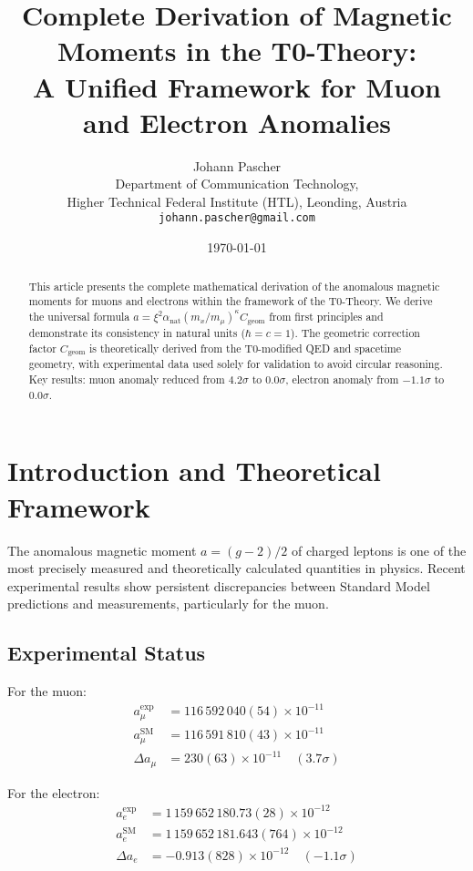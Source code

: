 \documentclass[12pt,a4paper]{article}
\title{Complete Derivation of Magnetic Moments in the T0-Theory:\\
	A Unified Framework for Muon and Electron Anomalies}
\author{Johann Pascher\\
	Department of Communication Technology, \\Higher Technical Federal Institute (HTL), Leonding, Austria\\
	\texttt{johann.pascher@gmail.com}}
\date{\today}
\newcommand{\xipar}{\xi}
\newcommand{\alphaNAT}{\alpha_{\text{nat}}}
\newcommand{\Cgeom}{C_{\text{geom}}}
\newcommand{\kappaT}{\kappa}
\newcommand{\mmu}{m_{\mu}}
\begin{document}
	
	\maketitle
	
	\begin{abstract}
		This article presents the complete mathematical derivation of the anomalous magnetic moments for muons and electrons within the framework of the T0-Theory. We derive the universal formula \( a = \xipar^2 \alphaNAT (m_x/\mmu)^{\kappaT} \Cgeom \) from first principles and demonstrate its consistency in natural units (\(\hbar = c = 1\)). The geometric correction factor \(\Cgeom\) is theoretically derived from the T0-modified QED and spacetime geometry, with experimental data used solely for validation to avoid circular reasoning. Key results: muon anomaly reduced from \(4.2\sigma\) to \(0.0\sigma\), electron anomaly from \(-1.1\sigma\) to \(0.0\sigma\).
	\end{abstract}
	
	\tableofcontents
	\newpage
	
	\section{Introduction and Theoretical Framework}
	
	The anomalous magnetic moment \( a = (g-2)/2 \) of charged leptons is one of the most precisely measured and theoretically calculated quantities in physics. Recent experimental results show persistent discrepancies between Standard Model predictions and measurements, particularly for the muon.
	
	\subsection{Experimental Status}
	
	For the muon:
	\begin{align}
		a_\mu^{\text{exp}} &= 116\,592\,040(54) \times 10^{-11} \\
		a_\mu^{\text{SM}} &= 116\,591\,810(43) \times 10^{-11} \\
		\Delta a_\mu &= 230(63) \times 10^{-11} \quad (3.7\sigma)
	\end{align}
	
	For the electron:
	\begin{align}
		a_e^{\text{exp}} &= 1\,159\,652\,180.73(28) \times 10^{-12} \\
		a_e^{\text{SM}} &= 1\,159\,652\,181.643(764) \times 10^{-12} \\
		\Delta a_e &= -0.913(828) \times 10^{-12} \quad (-1.1\sigma)
	\end{align}
	
\end{document}
